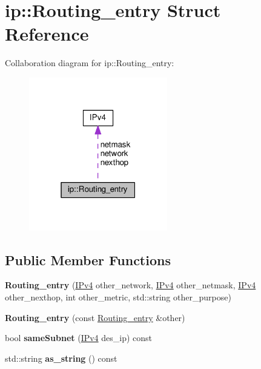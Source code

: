 \hypertarget{structip_1_1Routing__entry}{}\section{ip\+:\+:Routing\+\_\+entry Struct Reference}
\label{structip_1_1Routing__entry}


Collaboration diagram for ip\+:\+:Routing\+\_\+entry\+:
\nopagebreak
\begin{figure}[H]
\begin{center}
\leavevmode
\includegraphics[width=171pt]{structip_1_1Routing__entry__coll__graph}
\end{center}
\end{figure}
\subsection*{Public Member Functions}
\begin{DoxyCompactItemize}
\item 
{\bfseries Routing\+\_\+entry} (\hyperlink{structIPv4}{I\+Pv4} other\+\_\+network, \hyperlink{structIPv4}{I\+Pv4} other\+\_\+netmask, \hyperlink{structIPv4}{I\+Pv4} other\+\_\+nexthop, int other\+\_\+metric, std\+::string other\+\_\+purpose)\hypertarget{structip_1_1Routing__entry_aa74e68d82782de83e6adaee3307d71c3}{}\label{structip_1_1Routing__entry_aa74e68d82782de83e6adaee3307d71c3}

\item 
{\bfseries Routing\+\_\+entry} (const \hyperlink{structip_1_1Routing__entry}{Routing\+\_\+entry} \&other)\hypertarget{structip_1_1Routing__entry_af365ea3a7377448bdaf58dd82795bfa1}{}\label{structip_1_1Routing__entry_af365ea3a7377448bdaf58dd82795bfa1}

\item 
bool {\bfseries same\+Subnet} (\hyperlink{structIPv4}{I\+Pv4} des\+\_\+ip) const \hypertarget{structip_1_1Routing__entry_ae756d25da9d7cda6c2fe7aed59284b18}{}\label{structip_1_1Routing__entry_ae756d25da9d7cda6c2fe7aed59284b18}

\item 
std\+::string {\bfseries as\+\_\+string} () const \hypertarget{structip_1_1Routing__entry_ace4715a82faf3918f5cc75d1eb361f00}{}\label{structip_1_1Routing__entry_ace4715a82faf3918f5cc75d1eb361f00}

\end{DoxyCompactItemize}
